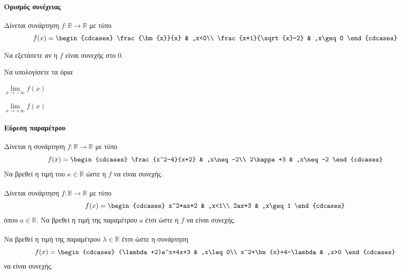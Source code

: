 \documentclass[11pt,a4paper,modern]{FFExercises}
\begin{document}
\paragraph{Ορισμός συνέχειας}
\askhsh Δίνεται συνάρτηση $f:\mathbb{R}\to\mathbb{R}$ με τύπο
\[ f(x)=\begin{cdcases}
\frac{\hm{x}}{x} & ,x<0\\ \frac{x+1}{\sqrt{x}-2} & ,x\geq 0
\end{cdcases} \]
\begin{alist}
\item Να εξετάσετε αν η $f$ είναι συνεχής στο $0$.
\item Να υπολογίσετε τα όρια
\begin{multicols}{2}
\begin{rlist}
\item $\lim\limits_{x\to-\infty}{f(x)}$
\item $\lim\limits_{x\to+\infty}{f(x)}$
\end{rlist}
\end{multicols}
\end{alist}
\paragraph{Εύρεση παραμέτρου}
\askhsh Δίνεται η συνάρτηση $f:\mathbb{R}\to\mathbb{R}$ με τύπο
\[ f(x)=\begin{cdcases}
\frac{x^2-4}{x+2} & ,x\neq -2\\ 2\kappa+3 & ,x\neq -2
\end{cdcases} \]
Να βρεθεί η τιμή του $\kappa\in\mathbb{R}$ ώστε η $f$ να είναι συνεχής.\\\\
\askhsh
Δίνεται συνάρτηση $f:\mathbb{R}\to\mathbb{R}$ με τύπο
\[ f(x)=\begin{cdcases}
x^2+ax+2 & ,x<1\\ 2ax+3 & ,x\geq 1
\end{cdcases} \]
όπου $a\in\mathbb{R}$. Να βρεθεί η τιμή της παραμέτρου $a$ έτσι ώστε η $f$ να είναι συνεχής.\\\\
\askhsh Να βρεθεί η τιμή της παραμέτρου $\lambda\in\mathbb{R}$ έτσι ώστε η συνάρτηση
\[ f(x)=\begin{cdcases}
(\lambda+2)e^x+4x+3 & ,x\leq 0\\ x^2+\hm{x}+4-\lambda & ,x>0
\end{cdcases} \]
να είναι συνεχής.\\\\
\end{document}
